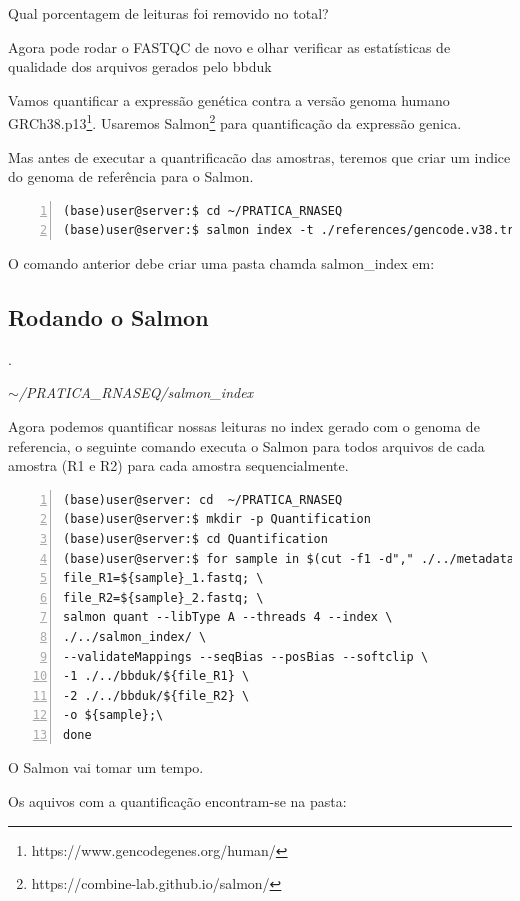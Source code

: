 \documentclass[letter,11pt]{book}
\begin{document}
Qual porcentagem de leituras foi removido no total?

Agora pode rodar o FASTQC de novo e olhar verificar as estatísticas de qualidade dos arquivos gerados pelo bbduk

Vamos quantificar a expressão genética contra a versão genoma humano GRCh38.p13\footnote{https://www.gencodegenes.org/human/}. Usaremos Salmon\footnote{https://combine-lab.github.io/salmon/} para quantificação da expressão genica.

Mas antes de executar a quantrificacão das amostras, teremos que criar um indice do genoma de referência para o Salmon.

\begin{Verbatim}[commandchars=!\{\}, numbers=left,label= Criando Salmon index ,frame=topline,fontsize=\scriptsize]
(base)user@server:$ cd ~/PRATICA_RNASEQ
(base)user@server:$ salmon index -t ./references/gencode.v38.transcripts.fa.gz -i salmon_index --threads 2
\end{Verbatim}

O comando anterior debe criar uma pasta chamda salmon\_index em:

\subsection{Rodando o Salmon}.

\emph{$\sim$/PRATICA\_RNASEQ/salmon\_index}

Agora podemos quantificar nossas leituras no index gerado com o genoma de referencia, o seguinte comando executa o Salmon para todos arquivos de cada amostra (R1 e R2) para cada amostra sequencialmente.

\begin{Verbatim}[commandchars=!\{\}, numbers=left,label= Criando Salmon index ,frame=topline,fontsize=\scriptsize]
(base)user@server: cd  ~/PRATICA_RNASEQ
(base)user@server:$ mkdir -p Quantification
(base)user@server:$ cd Quantification
(base)user@server:$ for sample in $(cut -f1 -d"," ./../metadata.csv | grep SRR); do \
file_R1=${sample}_1.fastq; \
file_R2=${sample}_2.fastq; \
salmon quant --libType A --threads 4 --index \
./../salmon_index/ \
--validateMappings --seqBias --posBias --softclip \
-1 ./../bbduk/${file_R1} \
-2 ./../bbduk/${file_R2} \
-o ${sample};\
done
\end{Verbatim}

O Salmon vai tomar um tempo.

Os aquivos com a quantificação encontram-se na pasta:
\end{document}
